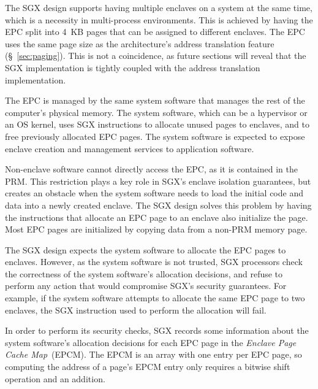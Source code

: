 The SGX design supports having multiple enclaves on a system at the same time,
which is a necessity in multi-process environments. This is achieved by having
the EPC split into 4~KB pages that can be assigned to different enclaves. The
EPC uses the same page size as the architecture's address translation feature
(\S~\ref{sec:paging}). This is not a coincidence, as future sections will
reveal that the SGX implementation is tightly coupled with the address
translation implementation.

The EPC is managed by the same system software that manages the rest of the
computer's physical memory. The system software, which can be a hypervisor or
an OS kernel, uses SGX instructions to allocate unused pages to enclaves, and
to free previously allocated EPC pages. The system software is expected to
expose enclave creation and management services to application software.

Non-enclave software cannot directly access the EPC, as it is contained in the
PRM. This restriction plays a key role in SGX's enclave isolation guarantees,
but creates an obstacle when the system software needs to load the initial code
and data into a newly created enclave. The SGX design solves this problem by
having the instructions that allocate an EPC page to an enclave also initialize
the page. Most EPC pages are initialized by copying data from a non-PRM memory
page.


\label{sec:sgx_epcm}


The SGX design expects the system software to allocate the EPC pages to
enclaves. However, as the system software is not trusted, SGX processors check
the correctness of the system software's allocation decisions, and refuse to
perform any action that would compromise SGX's security guarantees. For
example, if the system software attempts to allocate the same EPC page to two
enclaves, the SGX instruction used to perform the allocation will fail.

In order to perform its security checks, SGX records some information about the
system software's allocation decisions for each EPC page in the
\textit{Enclave Page Cache Map}~(EPCM). The EPCM is an array with one entry
per EPC page, so computing the address of a page's EPCM entry only requires a
bitwise shift operation and an addition.


